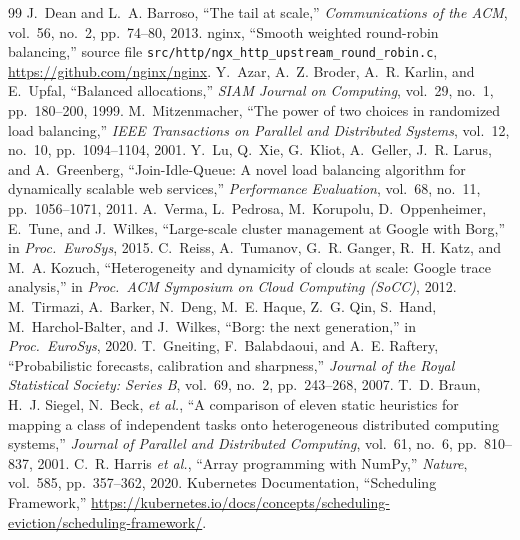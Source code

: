 \documentclass[11pt,a4paper]{article}
\newcommand{\code}[1]{\texttt{#1}}
\begin{document}
{}
\begin{thebibliography}{99}
 J.~Dean and L.~A. Barroso, ``The tail at scale,'' \emph{Communications of the ACM},
  vol.~56, no.~2, pp.~74--80, 2013.
 nginx, ``Smooth weighted round-robin balancing,'' source file
  \code{src/http/ngx\_http\_upstream\_round\_robin.c}, \url{https://github.com/nginx/nginx}.
 Y.~Azar, A.~Z. Broder, A.~R. Karlin, and E.~Upfal, ``Balanced allocations,''
  \emph{SIAM Journal on Computing}, vol.~29, no.~1, pp.~180--200, 1999.
 M.~Mitzenmacher, ``The power of two choices in randomized load balancing,''
  \emph{IEEE Transactions on Parallel and Distributed Systems}, vol.~12, no.~10, pp.~1094--1104, 2001.
 Y.~Lu, Q.~Xie, G.~Kliot, A.~Geller, J.~R. Larus, and A.~Greenberg, ``Join-Idle-Queue: A novel
  load balancing algorithm for dynamically scalable web services,'' \emph{Performance Evaluation}, vol.~68,
  no.~11, pp.~1056--1071, 2011.
 A.~Verma, L.~Pedrosa, M.~Korupolu, D.~Oppenheimer, E.~Tune, and J.~Wilkes,
  ``Large-scale cluster management at Google with Borg,'' in \emph{Proc.\ EuroSys}, 2015.
 C.~Reiss, A.~Tumanov, G.~R. Ganger, R.~H. Katz, and M.~A. Kozuch, ``Heterogeneity and
  dynamicity of clouds at scale: Google trace analysis,'' in \emph{Proc.\ ACM Symposium on Cloud Computing
  (SoCC)}, 2012.
 M.~Tirmazi, A.~Barker, N.~Deng, M.~E. Haque, Z.~G. Qin, S.~Hand, M.~Harchol-Balter, and
  J.~Wilkes, ``Borg: the next generation,'' in \emph{Proc.\ EuroSys}, 2020.
 T.~Gneiting, F.~Balabdaoui, and A.~E. Raftery, ``Probabilistic forecasts, calibration
  and sharpness,'' \emph{Journal of the Royal Statistical Society: Series B}, vol.~69, no.~2, pp.~243--268, 2007.
 T.~D. Braun, H.~J. Siegel, N.~Beck, \emph{et al.}, ``A comparison of eleven static heuristics
  for mapping a class of independent tasks onto heterogeneous distributed computing systems,'' \emph{Journal of
  Parallel and Distributed Computing}, vol.~61, no.~6, pp.~810--837, 2001.
 C.~R. Harris \emph{et al.}, ``Array programming with NumPy,'' \emph{Nature}, vol.~585,
  pp.~357--362, 2020.
 Kubernetes Documentation, ``Scheduling Framework,''
  \url{https://kubernetes.io/docs/concepts/scheduling-eviction/scheduling-framework/}.
\end{thebibliography}
\end{document}
